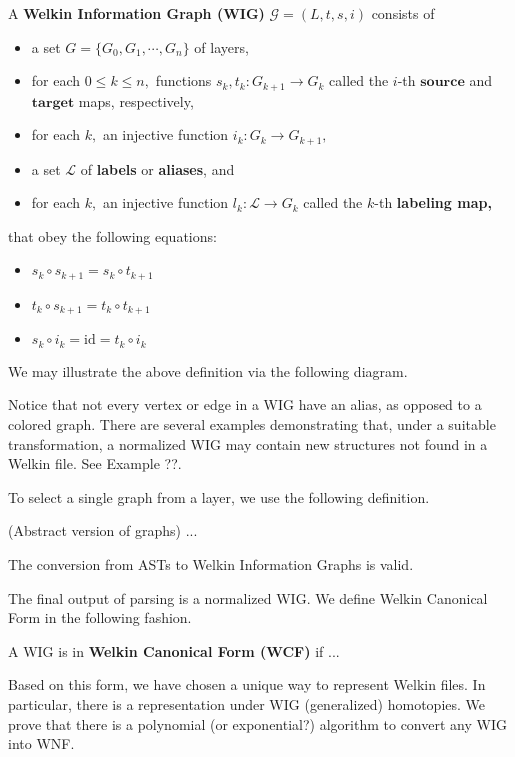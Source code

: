 \begin{definition}
	A \textbf{Welkin Information Graph (WIG)} $\mathcal{G} = (L, t, s, i)$ consists of
  \begin{itemize}
    \item a set $ G = \{G_{0}, G_{1}, \cdots, G_{n}\}$ of layers,
    \item for each $0 \leq k \leq n,$ functions $s_{k}, t_{k}: G_{k+1} \to G_{k}$ called the $i$-th $\textbf{source}$ and $\textbf{target}$ maps, respectively,
    \item for each $k,$ an injective function $i_{k}: G_{k} \to G_{k+1},$
    \item a set $\mathcal{L}$ of \textbf{labels} or \textbf{aliases}, and
    \item for each $k,$ an injective function $l_{k}: \mathcal{L} \to G_{k}$ called the $k$-th \textbf{labeling map,}
  \end{itemize}
  that obey the following equations:
  \begin{itemize}
    \item $s_{k} \circ s_{k+1} = s_{k} \circ t_{k+1}$
    \item $t_{k} \circ s_{k+1} = t_{k} \circ t_{k+1}$
    \item $s_{k} \circ i_{k} = \textrm{id} = t_{k} \circ i_{k} $
  \end{itemize}
  We may illustrate the above definition via the following diagram.
\end{definition}
Notice that not every vertex or edge in a WIG have an alias, as opposed to a colored graph. There are several examples demonstrating that, under a suitable transformation, a normalized WIG may contain new structures not found in a Welkin file. See Example ??.

To select a single graph from a layer, we use the following definition.
\begin{definition} (Abstract version of graphs) ...
\end{definition}
\begin{lemma}
The conversion from ASTs to Welkin Information Graphs is valid.
\end{lemma}
The final output of parsing is a normalized WIG. We define Welkin Canonical Form in the following fashion.
\begin{definition}
A WIG is in \textbf{Welkin Canonical Form (WCF)} if ...
\end{definition}
Based on this form, we have chosen a unique way to represent Welkin files. In particular, there is a representation under WIG (generalized) homotopies. We prove that there is a polynomial (or exponential?) algorithm to convert any WIG into WNF.

